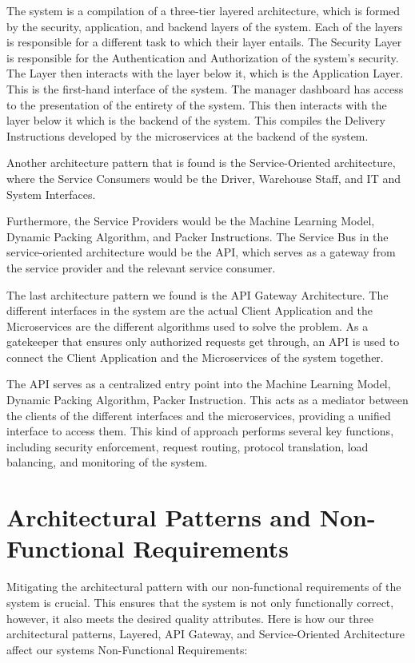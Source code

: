 \documentclass[a4paper,12pt]{article}
\begin{document}
The system is a compilation of a three-tier layered architecture, which is formed by the security, application, and backend layers of the system. Each of the layers is responsible for a different task to which their layer entails. The Security Layer is responsible for the Authentication and Authorization of the system's security. The Layer then interacts with the layer below it, which is the Application Layer. This is the first-hand interface of the system. The manager dashboard has access to the presentation of the entirety of the system. This then interacts with the layer below it which is the backend of the system. This compiles the Delivery Instructions developed by the microservices at the backend of the system.

Another architecture pattern that is found is the Service-Oriented architecture, where the Service Consumers would be the Driver, Warehouse Staff, and IT and System Interfaces.

Furthermore, the Service Providers would be the Machine Learning Model, Dynamic Packing Algorithm, and Packer Instructions. The Service Bus in the service-oriented architecture would be the API, which serves as a gateway from the service provider and the relevant service consumer.

The last architecture pattern we found is the API Gateway Architecture. The different interfaces in the system are the actual Client Application and the Microservices are the different algorithms used to solve the problem. As a gatekeeper that ensures only authorized requests get through, an API is used to connect the Client Application and the Microservices of the system together.

The API serves as a centralized entry point into the Machine Learning Model, Dynamic Packing Algorithm, Packer Instruction. This acts as a mediator between the clients of the different interfaces and the microservices, providing a unified interface to access them. This kind of approach performs several key functions, including security enforcement, request routing, protocol translation, load balancing, and monitoring of the system.

\section{Architectural Patterns and Non-Functional Requirements}
Mitigating the architectural pattern with our non-functional requirements of the system is crucial. This ensures that the system is not only functionally correct, however, it also meets the desired quality attributes. Here is how our three architectural patterns, Layered, API Gateway, and Service-Oriented Architecture affect our systems Non-Functional Requirements:
\end{document}

